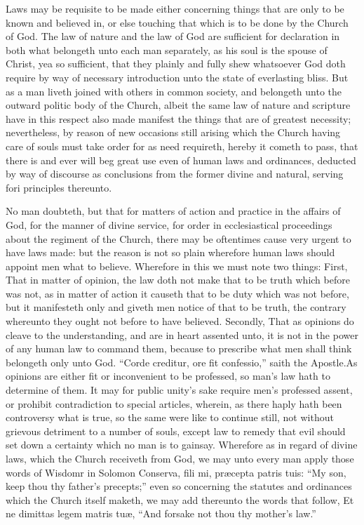 Laws may be requisite to be made either concerning things that are only to be known and believed in, or else touching that which is to be done by the Church of God. The law of nature and the law of God are sufficient for declaration in both what belongeth unto each man separately, as his soul is the spouse of Christ, yea so sufficient, that they plainly and fully shew whatsoever God doth require by way of necessary introduction unto the state of everlasting bliss. But as a man liveth joined with others in common society, and belongeth unto the outward politic body of the Church, albeit the same law of nature and scripture have in this respect also made manifest the things that are of greatest necessity; nevertheless, by reason of new occasions still arising which the Church having care of souls must take order for as need requireth, hereby it cometh to pass, that there is and ever will beg great use even of human laws and ordinances, deducted by way of discourse as conclusions from the former divine and natural, serving fori principles thereunto.

No man doubteth, but that for matters of action and practice in the affairs of God, for the manner of divine  service, for order in ecclesiastical proceedings about the regiment of the Church, there may be oftentimes cause very urgent to have laws made: but the reason is not so plain wherefore human laws should appoint men what to believe. Wherefore in this we must note two things: First, That in matter of opinion, the law doth not make that to be truth which before was not, as in matter of action it causeth that to be duty which was not before, but it manifesteth only and giveth men notice of that to be truth, the contrary whereunto they ought not before to have believed. Secondly, That as opinions do cleave to the understanding, and are in heart assented unto, it is not in the power of any human law to command them, because to prescribe what men shall think belongeth only unto God. “Corde creditur, ore fit confessio,” saith the Apostle.As opinions are either fit or inconvenient to be professed, so man’s law hath to determine of them. It may for public unity’s sake require men’s professed assent, or prohibit contradiction to special articles, wherein, as there haply hath been controversy what is true, so the same were like to continue still, not without grievous detriment to a number of souls, except law to remedy that evil should set down a certainty which no man is to gainsay. Wherefore as in regard of divine laws, which the Church receiveth from God, we may unto every man apply those words of Wisdomr in Solomon Conserva, fili mi, præcepta patris tuis: “My son, keep thou thy father’s precepts;” even so concerning the statutes and ordinances which the Church itself maketh, we may add thereunto the words that follow, Et ne dimittas legem matris tuæ, “And forsake not thou thy mother’s law.”

